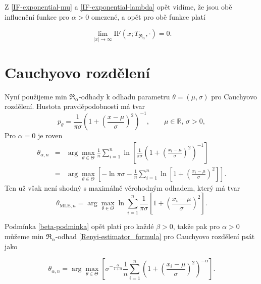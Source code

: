\noindent Z \eqref{IF-exponential-mu} a \eqref{IF-exponential-lambda} opět vidíme, že jsou obě influenční funkce pro $\alpha>0$ omezené, a opět pro obě funkce platí

\begin{equation}
	\lim_{|x| \rightarrow \infty} \mathrm{IF}(x;T_{\mathfrak{R}_\alpha},\cdot) = 0.
\end{equation}
 

\section{Cauchyovo rozdělení} %


Nyní použijeme min $\mathfrak{R}_\alpha$-odhady k odhadu parametru $\theta = (\mu,\sigma)$ pro Cauchyovo rozdělení. Hustota pravděpodobnosti má tvar
\begin{equation}
	p_\theta = \frac{1}{\pi\sigma} \left( 1 + \left( \frac{x-\mu}{\sigma} \right)^2 \right)^{-1}, \qquad \mu\in \mathbb{R},\, \sigma>0,
\end{equation}
Pro $\alpha = 0$ je {\mRao} roven
\begin{eqnarray}
	\theta_{\alpha,n} & = & \arg \max_{\theta \in \Theta} \frac{1}{n} \sum^n_{i=1} \ln \left[  \frac{1}{\pi\sigma} \left( 1 + \left( \frac{x_i-\mu}{\sigma} \right)^2 \right)^{-1}   \right] \nonumber \\
	& = & \arg \max_{\theta \in \Theta} \left[ -\ln \pi\sigma - \frac{1}{n} \sum^n_{i=1} \ln \left[ 1 + \left( \frac{x_i-\mu}{\sigma} \right)^2 \right] \right].
\end{eqnarray}
Ten už však není shodný s maximálně věrohodným odhadem, který má tvar
\begin{equation}
	\theta_{\mathrm{MLE},n} = \arg \max_{\theta \in \Theta}  \ln \sum^n_{i=1} \frac{1}{\pi\sigma} \left[ 1 + \left( \frac{x_i-\mu}{\sigma} \right)^2 \right].
\end{equation}


\noindent Podmínka \ref{beta-podminka} opět platí pro každé $\beta>0$, takže pak pro $\alpha>0$ můžeme  min $\mathfrak{R}_\alpha$-odhad \eqref{Renyi-estimator_formula} pro Cauchyovo rozdělení psát jako 

\begin{equation}
	\theta_{\alpha,n} = \arg \max_{\theta \in \Theta} \left[ \sigma^{-\frac{\alpha}{1+\alpha}} \frac{1}{n} \sum_{i=1}^n \left( 1 + \left( \frac{x_i-\mu}{\sigma} \right)^2 \right)^{-\alpha} \right].
	\label{renyi-formula-cauchy}
\end{equation}

